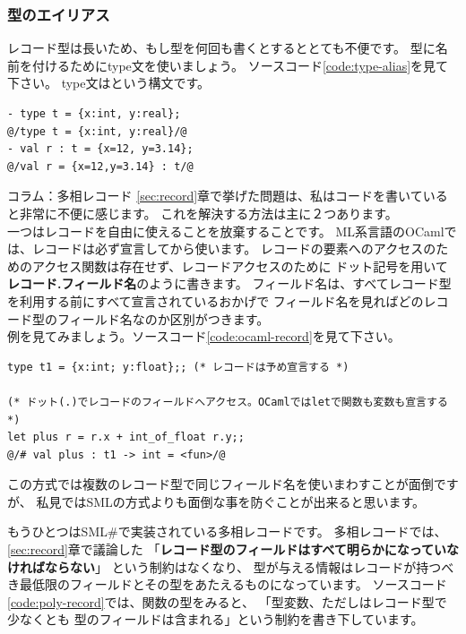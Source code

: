 \documentclass[11pt,a4paper]{jarticle}
\begin{document}
\subsubsection{型のエイリアス}

レコード型は長いため、もし型を何回も書くとするととても不便です。
型に名前を付けるためにtype文を使いましょう。
ソースコード\ref{code:type-alias}を見て下さい。
type文はという構文です。

\begin{lstlisting}[caption=型のエイリアス,label=code:type-alias]
- type t = {x:int, y:real};
@/type t = {x:int, y:real}/@
- val r : t = {x=12, y=3.14};
@/val r = {x=12,y=3.14} : t/@
\end{lstlisting}

\begin{itembox}[l]{コラム：多相レコード}
  \ref{sec:record}章で挙げた問題は、私はコードを書いていると非常に不便に感じます。
  これを解決する方法は主に２つあります。\\
  一つはレコードを自由に使えることを放棄することです。
  ML系言語のOCamlでは、レコードは必ず宣言してから使います。
  レコードの要素へのアクセスのためのアクセス関数は存在せず、レコードアクセスのために
  ドット記号を用いて\textbf{レコード.フィールド名}のように書きます。
  フィールド名は、すべてレコード型を利用する前にすべて宣言されているおかげで
  フィールド名を見ればどのレコード型のフィールド名なのか区別がつきます。\\
  例を見てみましょう。ソースコード\ref{code:ocaml-record}を見て下さい。

\begin{lstlisting}[caption=OCamlにおけるレコード,label=code:ocaml-record]
type t1 = {x:int; y:float};; (* レコードは予め宣言する *)

(* ドット(.)でレコードのフィールドへアクセス。OCamlではletで関数も変数も宣言する *)
let plus r = r.x + int_of_float r.y;;
@/# val plus : t1 -> int = <fun>/@
\end{lstlisting}

  この方式では複数のレコード型で同じフィールド名を使いまわすことが面倒ですが、
  私見ではSMLの方式よりも面倒な事を防ぐことが出来ると思います。

  もうひとつはSML\#で実装されている多相レコードです。
  多相レコードでは、\ref{sec:record}章で議論した
 「\textbf{レコード型のフィールドはすべて明らかになっていなければならない}」
  という制約はなくなり、
  型が与える情報はレコードが持つべき最低限のフィールドとその型をあたえるものになっています。
  ソースコード\ref{code:poly-record}では、関数の型をみると、
  「型変数、ただしはレコード型で少なくとも
  型のフィールドは含まれる」という制約を書き下しています。


\end{itembox}
\end{document}
